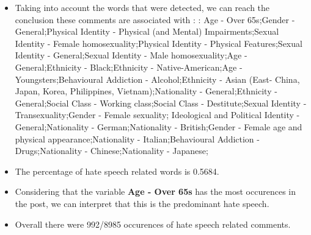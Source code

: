 \documentclass[11pt]{article}
\begin{document}
\begin{itemize}\item Taking into account the words that were detected, we can reach the conclusion these comments are associated with : : Age - Over 65s;Gender - General;Physical Identity - Physical (and Mental) Impairments;Sexual Identity - Female homosexuality;Physical Identity - Physical Features;Sexual Identity - General;Sexual Identity - Male homosexuality;Age - General;Ethnicity - Black;Ethnicity - Native-American;Age - Youngsters;Behavioural Addiction - Alcohol;Ethnicity - Asian (East- China, Japan, Korea, Philippines, Vietnam);Nationality - General;Ethnicity - General;Social Class - Working class;Social Class - Destitute;Sexual Identity - Transexuality;Gender - Female sexuality; Ideological and Political Identity - General;Nationality - German;Nationality - British;Gender - Female age and physical appearance;Nationality - Italian;Behavioural Addiction - Drugs;Nationality - Chinese;Nationality - Japanese;%

\item The percentage of hate speech related words is 0.5684.

\item Considering that the variable \textbf{Age - Over 65s} has the most occurences in the post, we can interpret that this is the predominant hate speech.

\item Overall there were 992/8985 occurences of hate speech related comments.\end{itemize}
\end{document}
